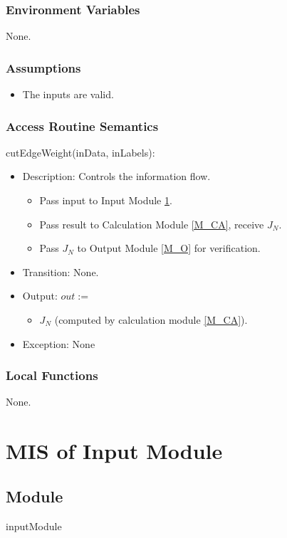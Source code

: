 \documentclass[12pt, titlepage]{article}
\begin{document}
\subsubsection{Environment Variables}
None.

\subsubsection{Assumptions}
\begin{itemize}
\item The inputs are valid.
\end{itemize}

\subsubsection{Access Routine Semantics}

\noindent cutEdgeWeight(inData, inLabels):
\begin{itemize}
\item Description: Controls the information flow.
\begin{itemize}
\item Pass input to Input Module \ref{M_I}.
\item Pass result to Calculation Module \ref{M_CA}, receive $J_N$.
\item Pass $J_N$ to Output Module \ref{M_O} for verification.
\end{itemize}

\item Transition: None.
\item Output: $out:=$
\begin{itemize}
\item $J_N$ (computed by calculation module \ref{M_CA}).
\end{itemize}
\item Exception: None
\end{itemize}

\subsubsection{Local Functions}
None.

\newpage
  \section{MIS of Input Module} \label{M_I}

\subsection{Module}
inputModule
\end{document}
